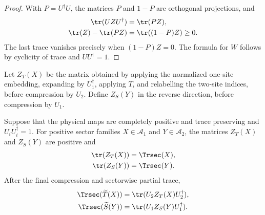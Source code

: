 \begin{proof}\leanok
    With $P=U^\dagger U$, the matrices $P$ and $1-P$ are orthogonal
    projections, and
    \begin{align}
        \tr(UZU^\dagger)
         & =\tr(PZ),
        \notag                \\
        \tr(Z)-\tr(PZ)
         & =\tr((1-P)Z)\geq0.
        \notag
    \end{align}
    The last trace vanishes precisely when $(1-P)Z=0$. The formula for $W$
    follows by cyclicity of trace and $UU^\dagger=1$.
\end{proof}

\begin{definition}
    \label{def:mpdo_vertical_sector_precompression}
    \leanok
    Let $Z_T(X)$ be the matrix obtained by applying the normalized one-site
    embedding, expanding by $U_1^\dagger$, applying $T$, and relabelling the
    two-site indices, before compression by $U_2$. Define $Z_S(Y)$ in the
    reverse direction, before compression by $U_1$.
\end{definition}

\begin{lemma}
    \label{lem:mpdo_vertical_sector_precompression_positive_trace}
    \leanok
    Suppose that the physical maps are completely positive and trace
    preserving and $U_iU_i^\dagger=1$. For positive sector families
    $X\in\mathcal A_1$ and $Y\in\mathcal A_2$, the matrices $Z_T(X)$ and
    $Z_S(Y)$ are positive and
    \begin{align}
        \tr(Z_T(X))
         & =\Trsec(X),
        \notag         \\
        \tr(Z_S(Y))
         & =\Trsec(Y).
        \notag
    \end{align}
    After the final compression and sectorwise partial trace,
    \begin{align}
        \Trsec(\widetilde T(X))
         & =\tr(U_2Z_T(X)U_2^\dagger),
        \notag                         \\
        \Trsec(\widetilde S(Y))
         & =\tr(U_1Z_S(Y)U_1^\dagger).
        \notag
    \end{align}
\end{lemma}

